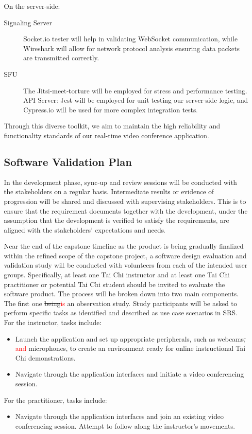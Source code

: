\documentclass[12pt, titlepage]{article}
\newcommand{\rt}[1]{\textcolor{red}{#1}}
\begin{document}
On the server-side:
\begin{description}
\item[Signaling Server] Socket.io tester will help in validating WebSocket
  communication, while Wireshark will allow for network protocol analysis
  ensuring data packets are transmitted correctly.
\item[SFU] The Jitsi-meet-torture will be employed for stress and performance
  testing. API Server: Jest will be employed for unit testing our server-side
  logic, and Cypress.io will be used for more complex integration tests.
\end{description}

Through this diverse toolkit, we aim to maintain the high reliability and
functionality standards of our real-time video conference application.


\subsection{Software Validation Plan}

In the development phase, sync-up and review sessions will be conducted with the
stakeholders on a regular basis. Intermediate results or evidence of progression
will be shared and discussed with supervising stakeholders. This is to ensure
that the requirement documents together with the development, under the
assumption that the development is verified to satisfy the requirements, are
aligned with the stakeholders’ expectations and needs.

Near the end of the capstone timeline as the product is being gradually
finalized within the refined scope of the capstone project, a software design
evaluation and validation study will be conducted with volunteers from each of
the intended user groups. Specifically, at least one Tai Chi instructor and at
least one Tai Chi practitioner or potential Tai Chi student should be invited to
evaluate the software product. The process will be broken down into two main
components. The first one \sout{being}\rt{is} an observation study. Study participants will be
asked to perform specific tasks as identified and described as use case
scenarios in SRS. For the instructor, tasks include:
\begin{itemize}
\item Launch the application and set up appropriate peripherals, such as webcams\sout{,} \rt{and}
  microphones, to create an environment ready for online instructional Tai Chi
  demonstrations.
\item Navigate through the application interfaces and initiate a video conferencing
  session.
\end{itemize}
For the practitioner, tasks include:
\begin{itemize}
\item Navigate through the application interfaces and join an existing video
  conferencing session. Attempt to follow along the instructor’s movements.
\end{itemize}
\end{document}

